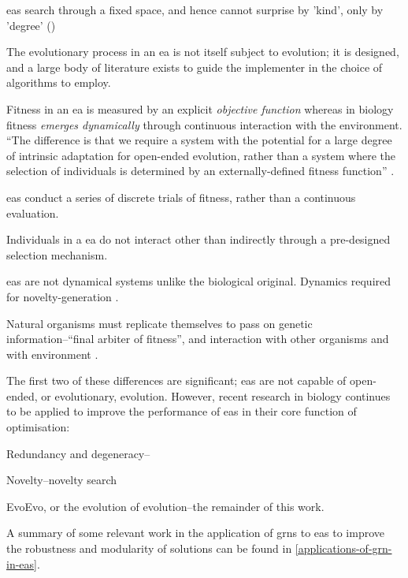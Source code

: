 \begin{compactitem}
\item \Glspl{ea} search through a fixed space, and hence cannot surprise by 'kind', only by 'degree' (\eg \cite{Nellis2014})
\item The evolutionary process in an \gls{ea} is not itself subject to evolution; it is designed, and a large body of literature exists to guide the implementer in the choice of algorithms to employ.
\item Fitness in an \gls{ea} is measured by an explicit \emph{objective function} whereas in biology fitness \emph{emerges dynamically} through continuous interaction with the environment. ``The difference is that we require a system with the potential for a large degree of intrinsic adaptation for open-ended evolution, rather than a system where the selection of individuals is determined by an externally-defined fitness function'' \parencite{Taylor2001}.
\item \Glspl{ea} conduct a series of discrete trials of fitness, rather than a continuous evaluation.
\item Individuals in a \gls{ea} do not interact other than indirectly through a pre-designed selection mechanism.
\item \Glspl{ea} are not dynamical systems unlike the biological original. Dynamics required for novelty-generation \parencite{Nellis2012}.
\item Natural organisms must replicate themselves to pass on genetic information--``final arbiter of fitness'', and interaction with other organisms and with environment \parencite{Ofria2004}.
\end{compactitem}

The first two of these differences are significant; \glspl{ea} are not capable of open-ended, or evolutionary, evolution. However, recent research in biology continues to be applied to improve the performance of \glspl{ea} in their core function of optimisation:
\begin{compactitem}
	\item Redundancy and degeneracy--\eg \cite{Whitacre:2010qy}
	\item Novelty--\eg novelty search \parencite{Lehman:2008cr}
	\item EvoEvo, or the evolution of evolution--\eg the remainder of this work.
\end{compactitem}

A summary of some relevant work in the application of \glspl{grn} to \glspl{ea} to improve the robustness and modularity of solutions can be found in \cref{applications-of-grn-in-eas}.

